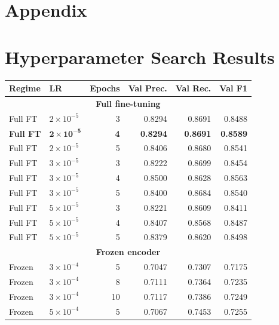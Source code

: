 \documentclass[11pt,a4paper,twocolumn]{article}
\begin{document}



\clearpage
\onecolumn
\appendix
\section*{Appendix}


\section{Hyperparameter Search Results}
\label{app:hyperparams}

\begin{table}[t]
\centering
\footnotesize
\setlength{\tabcolsep}{5pt}
\begin{tabular}{@{}llrrrr@{}}
\toprule
\textbf{Regime} & \textbf{LR} & \textbf{Epochs} & \textbf{Val Prec.} & \textbf{Val Rec.} & \textbf{Val F1} \\
\midrule
\multicolumn{6}{c}{\textbf{Full fine-tuning}}\\
Full FT & $2\times10^{-5}$ & 3 & 0.8294 & 0.8691 & 0.8488 \\
\textbf{Full FT} & $\mathbf{2\times10^{-5}}$ & \textbf{4} & \textbf{0.8294} & \textbf{0.8691} & \textbf{0.8589} \\
Full FT & $2\times10^{-5}$ & 5 & 0.8406 & 0.8680 & 0.8541 \\
Full FT & $3\times10^{-5}$ & 3 & 0.8222 & 0.8699 & 0.8454 \\
Full FT & $3\times10^{-5}$ & 4 & 0.8500 & 0.8628 & 0.8563 \\
Full FT & $3\times10^{-5}$ & 5 & 0.8400 & 0.8684 & 0.8540 \\
Full FT & $5\times10^{-5}$ & 3 & 0.8221 & 0.8609 & 0.8411 \\
Full FT & $5\times10^{-5}$ & 4 & 0.8407 & 0.8568 & 0.8487 \\
Full FT & $5\times10^{-5}$ & 5 & 0.8379 & 0.8620 & 0.8498 \\
\midrule
\multicolumn{6}{c}{\textbf{Frozen encoder}}\\
Frozen & $3\times10^{-4}$ & 5  & 0.7047 & 0.7307 & 0.7175 \\
Frozen & $3\times10^{-4}$ & 8  & 0.7111 & 0.7364 & 0.7235 \\
Frozen & $3\times10^{-4}$ & 10 & 0.7117 & 0.7386 & 0.7249 \\
Frozen & $5\times10^{-4}$ & 5  & 0.7067 & 0.7453 & 0.7255 \\

\end{tabular}
\end{table}
\end{document}
